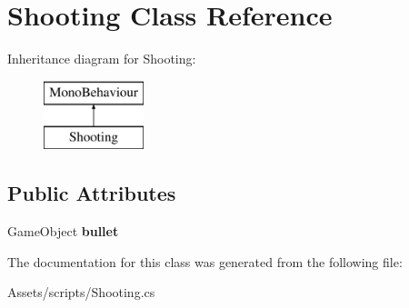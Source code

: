 \hypertarget{class_shooting}{}\section{Shooting Class Reference}
\label{class_shooting}
Inheritance diagram for Shooting\+:\begin{figure}[H]
\begin{center}
\leavevmode
\includegraphics[height=2.000000cm]{class_shooting}
\end{center}
\end{figure}
\subsection*{Public Attributes}
\begin{DoxyCompactItemize}
\item 
\mbox{\label{class_shooting_a332399d24695a92949c8d5bbac43d26c}} 
Game\+Object {\bfseries bullet}
\end{DoxyCompactItemize}


The documentation for this class was generated from the following file\+:\begin{DoxyCompactItemize}
\item 
Assets/scripts/Shooting.\+cs\end{DoxyCompactItemize}
